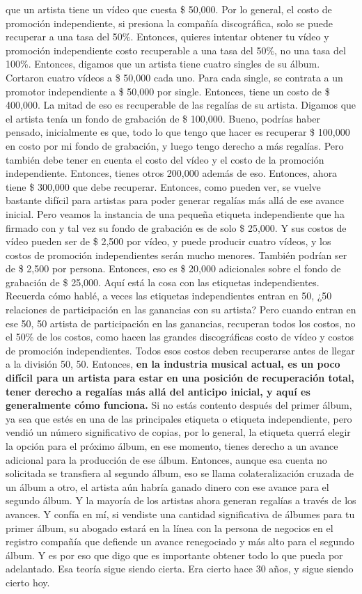 \documentclass[10pt]{book}
\begin{document}
que un artista tiene un vídeo que cuesta \$ 50,000. Por lo general, el costo de promoción independiente, si presiona la compañía discográfica, solo se puede recuperar a una tasa del 50\%. Entonces, quieres intentar obtener tu vídeo y promoción independiente costo recuperable a una tasa del 50\%, no una tasa del 100\%. Entonces, digamos que un artista tiene cuatro singles de su álbum. Cortaron cuatro vídeos a \$ 50,000 cada uno. Para cada single, se contrata a un promotor independiente a \$ 50,000 por single. Entonces, tiene un costo de \$ 400,000. La mitad de eso es recuperable de las regalías de su artista. Digamos que el artista tenía un fondo de grabación de \$ 100,000. Bueno, podrías haber pensado, inicialmente es que, todo lo que tengo que hacer es recuperar \$ 100,000 en costo por mi fondo de grabación, y luego tengo derecho a más regalías. Pero también debe tener en cuenta el costo del vídeo y el costo de la promoción independiente. Entonces, tienes otros 200,000 además de eso. Entonces, ahora tiene \$ 300,000 que debe recuperar. Entonces, como pueden ver, se vuelve bastante difícil para artistas para poder generar regalías más allá de ese avance inicial. Pero veamos la instancia de una pequeña etiqueta independiente que ha firmado con y tal vez su fondo de grabación es de solo \$ 25,000. Y sus costos de vídeo pueden ser de \$ 2,500 por vídeo, y puede producir cuatro vídeos, y los costos de promoción independientes serán mucho menores. También podrían ser de \$ 2,500 por persona. Entonces, eso es \$ 20,000 adicionales sobre el fondo de grabación de \$ 25,000. Aquí está la cosa con las etiquetas independientes. Recuerda cómo hablé, a veces las etiquetas independientes entran en 50, ¿50 relaciones de participación en las ganancias con su artista? Pero cuando entran en ese 50, 50 artista de participación en las ganancias, recuperan todos los costos, no el 50\% de los costos, como hacen las grandes discográficas costo de vídeo y costos de promoción independientes. Todos esos costos deben recuperarse antes de llegar a la división 50, 50. Entonces, \textbf{en la industria musical actual, es un poco difícil para un artista para estar en una posición de recuperación total, tener derecho a regalías más allá del anticipo inicial, y aquí es generalmente cómo funciona.} Si no estás contento después del primer álbum, ya sea que estés en una de las principales etiqueta o etiqueta independiente, pero vendió un número significativo de copias, por lo general, la etiqueta querrá elegir la opción para el próximo álbum, en ese momento, tienes derecho a un avance adicional para la producción de ese álbum. Entonces, aunque esa cuenta no solicitada se transfiera al segundo álbum, eso se llama colateralización cruzada de un álbum a otro, el artista aún habría ganado dinero con ese avance para el segundo álbum. Y la mayoría de los artistas ahora generan regalías a través de los avances. Y confía en mí, si vendiste una cantidad significativa de álbumes para tu primer álbum, su abogado estará en la línea con la persona de negocios en el registro compañía que defiende un avance renegociado y más alto para el segundo álbum. Y es por eso que digo que es importante obtener todo lo que pueda por adelantado. Esa teoría sigue siendo cierta. Era cierto hace 30 años, y sigue siendo cierto hoy.
\end{document}
